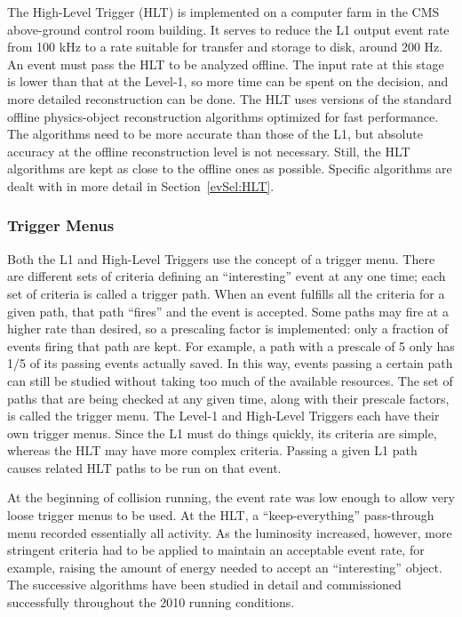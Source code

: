 The High-Level Trigger (HLT) \cite{hlt-0512077} 
is implemented on a computer farm in the 
CMS above-ground control room building.  
It serves to reduce the L1 output event rate from 
100 kHz to a rate suitable 
for transfer and storage to disk, around 200 Hz.  
An event must pass the HLT to be analyzed offline.  
The input rate at this stage is lower than that at the Level-1, 
so more time can be 
spent %
on the decision, 
and more detailed reconstruction can be done.  
The HLT uses versions of the standard offline physics-object reconstruction algorithms 
optimized for fast performance.  
The algorithms need to be more accurate than those of the L1, 
but absolute accuracy at the offline reconstruction level is not necessary.  
Still, the HLT algorithms are kept as close to the offline ones as possible.  
Specific algorithms are dealt with in more detail in 
Section~\ref{evSel:HLT}.  

\subsubsection{Trigger Menus}
\label{exp:trigMenus}
Both the L1 and High-Level Triggers use the concept of a trigger menu.  
There are different sets of criteria defining an ``interesting'' event 
at any one time;  
each set of criteria is called a trigger path.  
When an event fulfills all the criteria for a given path, 
that path ``fires'' and the event is accepted.  
Some paths may fire at a higher rate than desired, 
so a prescaling factor is implemented: 
only a fraction of events firing that path are kept.  
For example, a path with a prescale of 5 only 
has 1/5 of its passing events actually saved.  
In this way, events passing a certain path can still 
be studied without taking too much of the available resources.  
The set of paths that are being checked at any given time,
along with their prescale factors,  
is called the trigger menu.  
The Level-1 and High-Level Triggers each have their own 
trigger menus.  
Since the L1 must do things quickly, 
its criteria are simple, 
whereas the HLT may have more complex criteria.  
Passing a given L1 path causes 
related HLT paths to be run on that event.  

At the beginning of collision running, 
the event rate was low enough to allow very loose trigger 
menus to be used.  
At the HLT, a ``keep-everything'' pass-through menu 
recorded essentially all activity.  
As the luminosity increased, however, more stringent criteria had 
to be applied to maintain an acceptable event rate, 
for example, raising the amount of energy needed to accept an 
``interesting'' object.  
The successive algorithms have been studied in detail and 
commissioned successfully throughout the 2010 running conditions.  

